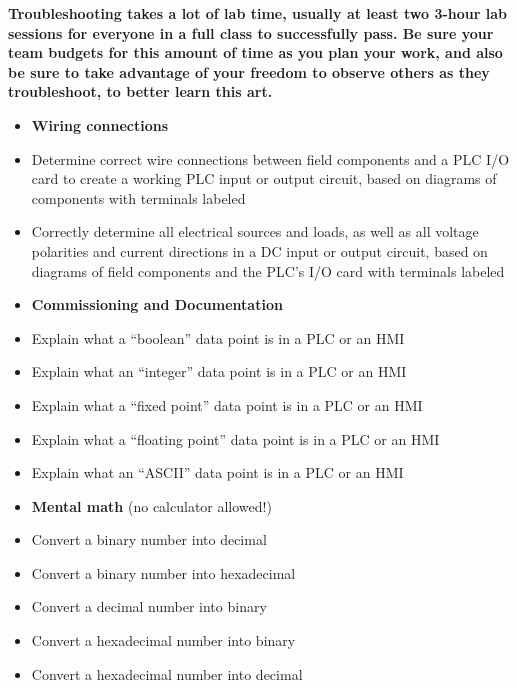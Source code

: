 \documentclass[12pt,a4paper]{article}
\begin{document}
\begin{itemize}
\vskip 10pt

{\bf Troubleshooting takes a lot of lab time, usually at least two 3-hour lab sessions for everyone in a full class to successfully pass.  Be sure your team budgets for this amount of time as you plan your work, and also be sure to take advantage of your freedom to observe others as they troubleshoot, to better learn this art.}







\vfil \eject

\noindent
{} 

\begin{itemize}
\item{} {\bf Wiring connections}
\item{} Determine correct wire connections between field components and a PLC I/O card to create a working PLC input or output circuit, based on diagrams of components with terminals labeled
\item{} Correctly determine all electrical sources and loads, as well as all voltage polarities and current directions in a DC input or output circuit, based on diagrams of field components and the PLC's I/O card with terminals labeled
\end{itemize}

\filbreak

\begin{itemize}
\item{} {\bf Commissioning and Documentation}
\item{} Explain what a ``boolean'' data point is in a PLC or an HMI 
\item{} Explain what an ``integer'' data point is in a PLC or an HMI 
\item{} Explain what a ``fixed point'' data point is in a PLC or an HMI 
\item{} Explain what a ``floating point'' data point is in a PLC or an HMI 
\item{} Explain what an  ``ASCII'' data point is in a PLC or an HMI 
\end{itemize}

\filbreak

\begin{itemize}
\item{} {\bf Mental math} (no calculator allowed!)
\item{} Convert a binary number into decimal
\item{} Convert a binary number into hexadecimal
\item{} Convert a decimal number into binary
\item{} Convert a hexadecimal number into binary
\item{} Convert a hexadecimal number into decimal
\end{itemize}


\end{itemize}
\end{document}
